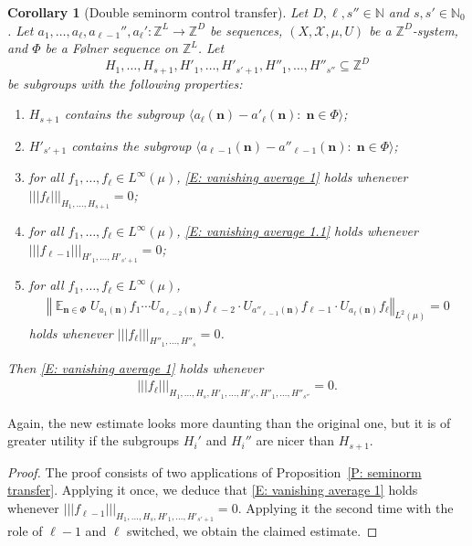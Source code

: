 \documentclass[11pt]{amsart}
\newtheorem{corollary}[lemma]{Corollary}
\theoremstyle{definition}
\DeclareMathOperator*{\E}{\mathbb{E}}
\newcommand{\N}{{\mathbb N}}
\newcommand{\Z}{{\mathbb Z}}
\newcommand{\CX}{{\mathcal X}}
\newcommand{\bn}{{\mathbf{n}}}
\newcommand{\norm}[1]{\left\Vert #1\right\Vert}
\newcommand{\nnorm}[1]{\lvert\!|\!| #1|\!|\!\rvert}
\newcommand{\1}{{\mathbf{1}}}
\begin{document}
\begin{corollary}[Double seminorm control transfer]\label{C: seminorm transfer}
    Let $D,\ell,s''\in\N$ and $s,s'\in\N_0$.
    Let $a_1, \ldots, a_\ell, a_{\ell-1}'', a_\ell':\Z^L\to\Z^D$ be sequences, $(X, \CX, \mu, U)$ be a $\Z^D$-system, and $\Phi$ be a F{\o}lner sequence on $\Z^L$. Let $$H_1, \ldots, H_{s+1}, H'_1, \ldots, H'_{s'+1}, H''_1, \ldots, H''_{s''}\subseteq \Z^D$$ be subgroups with the following properties:
    \begin{enumerate}
        \item $H_{s+1}$ contains the subgroup $\langle a_\ell(\bn)-a'_\ell(\bn)\colon\; \bn\in\Phi\rangle$;
        \item $H'_{s'+1}$ contains the subgroup $\langle a_{\ell-1}(\bn)-a''_{\ell-1}(\bn)\colon\; \bn\in\Phi\rangle$;
        \item for all $f_1, \ldots, f_\ell\in L^\infty(\mu)$, \eqref{E: vanishing average 1} holds
        whenever $\nnorm{f_\ell}_{H_1, \ldots, H_{s+1}} = 0$;
        \item for all $f_1, \ldots, f_{\ell}\in L^\infty(\mu)$, \eqref{E: vanishing average 1.1} holds
        whenever $\nnorm{f_{\ell-1}}_{H'_1, \ldots, H'_{s'+1}} = 0$;
        \item for all $f_1, \ldots, f_\ell\in L^\infty(\mu)$,
\begin{align*}
    \norm{\E_{\bn\in\Phi}U_{a_1(\bn)}f_1\cdots U_{a_{\ell-2}(\bn)}f_{\ell-2}\cdot U_{a''_{\ell-1}(\bn)}f_{\ell-1}\cdot U_{a_\ell(\bn)}f_\ell}_{L^2(\mu)} = 0
\end{align*} holds
whenever $\nnorm{f_\ell}_{H''_1, \ldots, H''_{s}} = 0$.
    \end{enumerate}
     Then \eqref{E: vanishing average 1} holds whenever 
     \begin{align*}
         \nnorm{f_\ell}_{H_1, \ldots, H_{s}, H'_1, \ldots, H'_{s'}, H''_1, \ldots, H''_{s''}} = 0.
     \end{align*}
\end{corollary}
Again, the new estimate looks more daunting than the original one, but it is of greater utility if the subgroups $H_i'$ and $H_i''$ are nicer than $H_{s+1}$.
\begin{proof}
    The proof consists of two applications of Proposition~\ref{P: seminorm transfer}. Applying it once, we deduce that
    \eqref{E: vanishing average 1} holds whenever $\nnorm{f_{\ell-1}}_{H_1, \ldots, H_{s}, H'_1, \ldots, H'_{s'+1}} = 0$. Applying it the second time with the role of $\ell-1$ and $\ell$ switched,  we obtain the claimed estimate. 
\end{proof}
\end{document}
